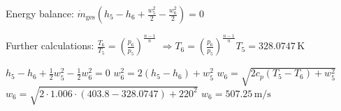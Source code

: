 Energy balance:  
\( \dot{m}_{\text{ges}} \left( h_5 - h_6 + \frac{w_5^2}{2} - \frac{w_6^2}{2} \right) = 0 \)  

Further calculations:  
\( \frac{T_6}{T_5} = \left( \frac{p_6}{p_5} \right)^{\frac{n-1}{n}} \)  
\( \Rightarrow T_6 = \left( \frac{p_6}{p_5} \right)^{\frac{n-1}{n}} T_5 = 328.0747 \, \text{K} \)  

\( h_5 - h_6 + \frac{1}{2} w_5^2 - \frac{1}{2} w_6^2 = 0 \)  
\( w_6^2 = 2 \left( h_5 - h_6 \right) + w_5^2 \)  
\( w_6 = \sqrt{2 c_p \left( T_5 - T_6 \right) + w_5^2} \)  
\( w_6 = \sqrt{2 \cdot 1.006 \cdot \left( 403.8 - 328.0747 \right) + 220^2} \)  
\( w_6 = 507.25 \, \text{m/s} \)